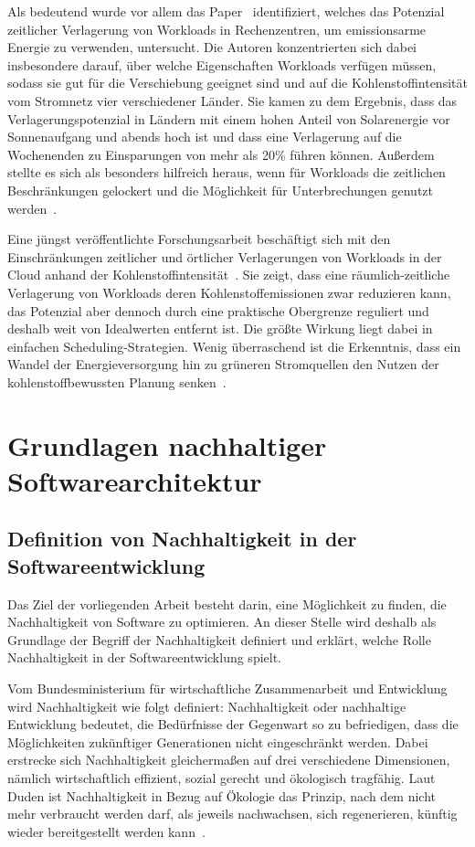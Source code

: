 Als bedeutend wurde vor allem das Paper~\cite{Wiesner.2021} identifiziert, welches das Potenzial zeitlicher Verlagerung von Workloads in Rechenzentren, um emissionsarme Energie zu verwenden, untersucht.
Die Autoren konzentrierten sich dabei insbesondere darauf, über welche Eigenschaften Workloads verfügen müssen, sodass sie gut für die Verschiebung geeignet sind und auf die Kohlenstoffintensität vom Stromnetz vier verschiedener Länder.
Sie kamen zu dem Ergebnis, dass das Verlagerungspotenzial in Ländern mit einem hohen Anteil von Solarenergie vor Sonnenaufgang und abends hoch ist und dass eine Verlagerung auf die Wochenenden zu Einsparungen von mehr als 20\% führen können.
Außerdem stellte es sich als besonders hilfreich heraus, wenn für Workloads die zeitlichen Beschränkungen gelockert und die Möglichkeit für Unterbrechungen genutzt werden~\cite{Wiesner.2021}.

Eine jüngst veröffentlichte Forschungsarbeit beschäftigt sich mit den Einschränkungen zeitlicher und örtlicher Verlagerungen von Workloads in der Cloud anhand der Kohlenstoffintensität~\cite{Sukprasert.2023}.
Sie zeigt, dass eine räumlich-zeitliche Verlagerung von Workloads deren Kohlenstoffemissionen zwar reduzieren kann, das Potenzial aber dennoch durch eine praktische Obergrenze reguliert und deshalb weit von Idealwerten entfernt ist.
Die größte Wirkung liegt dabei in einfachen Scheduling-Strategien.
Wenig überraschend ist die Erkenntnis, dass ein Wandel der Energieversorgung hin zu \glqq grüneren\grqq{} Stromquellen den Nutzen der kohlenstoffbewussten Planung senken~\cite{Sukprasert.2023}.
\chapter{Grundlagen nachhaltiger Softwarearchitektur}
\section{Definition von Nachhaltigkeit in der Softwareentwicklung}
Das Ziel der vorliegenden Arbeit besteht darin, eine Möglichkeit zu finden, die Nachhaltigkeit von Software zu optimieren.
An dieser Stelle wird deshalb als Grundlage der Begriff der Nachhaltigkeit definiert und erklärt, welche Rolle Nachhaltigkeit in der Softwareentwicklung spielt.

Vom Bundesministerium für wirtschaftliche Zusammenarbeit und Entwicklung~\cite{BundesministeriumWirtschaftlicheZusammenarbeitundEntwicklung} wird Nachhaltigkeit wie folgt definiert:
\glqq Nachhaltigkeit oder nachhaltige Entwicklung bedeutet, die Bedürfnisse der Gegenwart so zu befriedigen, dass die Möglichkeiten zukünftiger Generationen nicht eingeschränkt werden.\grqq{}
Dabei erstrecke sich Nachhaltigkeit gleichermaßen auf drei verschiedene Dimensionen, nämlich wirtschaftlich effizient, sozial gerecht und ökologisch tragfähig.
Laut Duden ist Nachhaltigkeit in Bezug auf Ökologie das \glqq Prinzip, nach dem nicht mehr verbraucht werden darf, als jeweils nachwachsen, sich regenerieren, künftig wieder bereitgestellt werden kann\grqq{}~\cite{Dudenredaktion.27.04.2018}.

